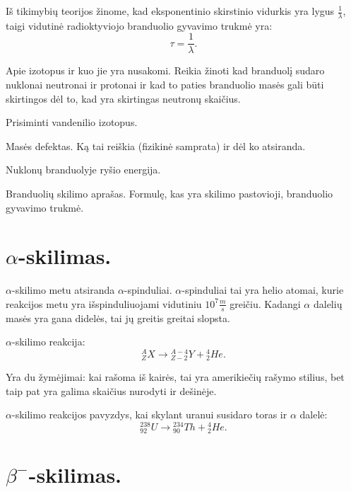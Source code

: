 Iš tikimybių teorijos žinome, kad eksponentinio skirstinio vidurkis
yra lygus $\frac{1}{\lambda}$, taigi vidutinė radioktyviojo
branduolio gyvavimo trukmė yra:
\begin{equation*}
  \tau = \frac{1}{\lambda}.
\end{equation*}

\begin{remember}
  \item Apie izotopus ir kuo jie yra nusakomi. Reikia žinoti
    kad branduolį sudaro nuklonai neutronai ir protonai ir kad
    to paties branduolio masės gali būti skirtingos dėl to, kad
    yra skirtingas neutronų skaičius.
  \item Prisiminti vandenilio izotopus.
  \item Masės defektas. Ką tai reiškia (fizikinė samprata) ir dėl
    ko atsiranda.
  \item Nuklonų branduolyje ryšio energija.
  \item Branduolių skilimo aprašas. Formulę, kas yra skilimo
    pastovioji, branduolio gyvavimo trukmė.
\end{remember}

\section{$\alpha$-skilimas.}


$\alpha$-skilimo metu atsiranda $\alpha$-spinduliai. $\alpha$-spinduliai
tai yra helio atomai, kurie reakcijos metu yra išspinduliuojami
vidutiniu $10^{7} \frac{m}{s}$ greičiu. Kadangi $\alpha$ dalelių masės
yra gana didelės, tai jų greitis greitai slopsta.

$\alpha$-skilimo reakcija:
\begin{equation*}
  {}_{Z}^{A}X \to {}_{Z-2}^{A-4}Y + {}_{2}^{4}He.
\end{equation*}
\begin{note}
  Yra du žymėjimai: kai rašoma iš kairės, tai yra amerikiečių
  rašymo stilius, bet taip pat yra galima skaičius nurodyti ir
  dešinėje.
\end{note}

$\alpha$-skilimo reakcijos pavyzdys, kai skylant uranui susidaro toras
ir $\alpha$ dalelė:
\begin{equation*}
  {}_{92}^{238}U \to {}_{90}^{234}Th + {}_{2}^{4}He.
\end{equation*}

\section{$\beta^{-}$-skilimas.}

